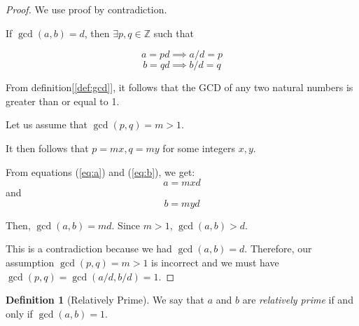 \documentclass[english,notitlepage,smartquotes]{hgbreport}
\theoremstyle{definition}
\newtheorem*{definition}{Definition}
\theoremstyle{remark}
\theoremstyle{plain}
\begin{document}
\begin{proof}
We use proof by contradiction.

If $\gcd(a,b)=d$, then $\exists p,q\in\mathbb{Z}$ such that

\begin{equation}
\label{eq:a}
a=pd\implies a/d=p
\end{equation}
\begin{equation}
\label{eq:b}
b=qd\implies b/d=q
\end{equation}

From definition[\ref{def:gcd}], it follows that the GCD of any two natural numbers is greater than or equal to 1. 

Let us assume that $\gcd(p, q)=m>1$.

It then follows that $p=mx,q=my$ for some integers $x, y$.

From equations (\ref{eq:a}) and (\ref{eq:b}), we get:
$$
a=mxd
$$
and
$$
b=myd
$$

Then, $\gcd(a, b)=md$. Since $m>1$, $\gcd(a, b) > d$.

This is a contradiction because we had $\gcd(a,b)=d$. Therefore, our assumption $\gcd(p,q)=m>1$ is incorrect and we must have $\gcd(p,q)=\gcd(a/d,b/d)=1$.
\end{proof}
\begin{definition}[Relatively Prime]
We say that $a$ and $b$ are \emph{relatively prime} if and only if $\gcd(a,b)=1$.
\end{definition}
\end{document}
